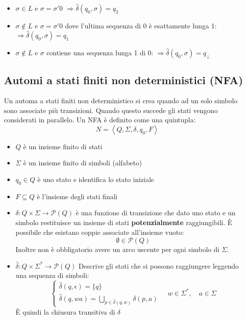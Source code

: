 \documentclass[a4paper]{article}
\begin{document}
\begin{exercise}
\begin{itemize}
    \item \( \sigma \in L \) e \( \sigma = \sigma'0 \) 
      \(
        \Rightarrow \hat{\delta}(q_0, \sigma) = q_2
      \) 

    \item \( \sigma \notin L \) e \( \sigma = \sigma'0 \) dove l'ultima sequenza di 0
      è esattamente lunga 1:
      \(
        \Rightarrow \hat{\delta}(q_0, \sigma) = q_1
      \) 

    \item \( \sigma \notin L \) e \( \sigma  \) contiene una sequenza lunga 1 di 0:
      \(
        \Rightarrow \hat{\delta}(q_0, \sigma) = q_{\bot}
      \)
  \end{itemize}
\end{exercise}

\subsection{Automi a stati finiti non deterministici (NFA)}
Un automa a stati finiti non deterministico si crea quando ad un solo simbolo sono
associate più transizioni. Quando questo succede gli stati vengono considerati in
parallelo. Un NFA è definito come una quintupla:
\[
  N = \left< Q, \Sigma, \delta, q_0, F \right>
\] 
\begin{itemize}
  \item \( Q \) è un insieme finito di stati
  \item \( \Sigma  \) è un insieme finito di simboli (alfabeto)
  \item \( q_0 \in Q \) è uno stato e identifica lo stato iniziale
  \item \( F \subseteq Q \) è l'insieme degli stati finali
  \item \( \delta: Q \times \Sigma \to \mathcal{P}(Q) \) è una funzione di transizione che
    dato uno stato e un simbolo restituisce un insieme di stati \textbf{potenzialmente}
    raggiungibili. È possibile che esistano coppie associate all'insieme vuoto:
    \[
      \emptyset \in \mathcal{P}(Q)
    \] 
    Inoltre non è obbligatorio avere un arco uscente per ogni simbolo di \( \Sigma \).
  \item \( \hat{\delta}: Q \times \Sigma^* \to \mathcal{P}(Q) \) Descrive gli stati che si possono
    raggiungere leggendo una sequenza di simboli:
    \[
      \begin{cases}
        \hat{\delta}(q, \epsilon) = \{q\}\\
        \hat{\delta}(q, wa) = \bigcup_{p \in \hat{\delta}(q,w)} \delta(p, a)
      \end{cases}
      \quad
      w \in \Sigma^*, \quad a \in \Sigma 
    \] 
    È quindi la chiusura transitiva di \( \delta \)
\end{itemize}
\end{document}

